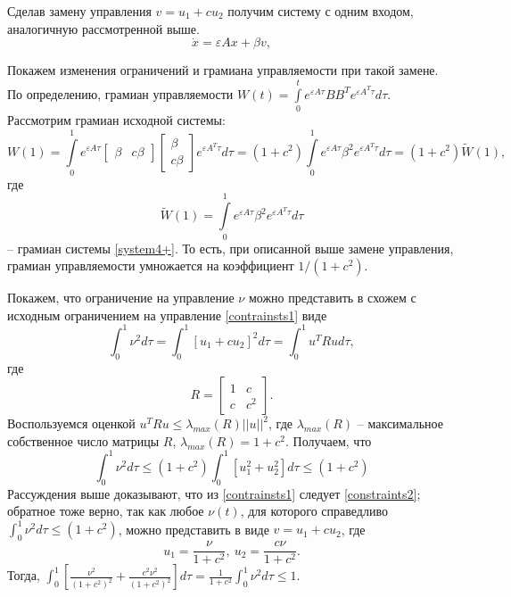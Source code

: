 \documentclass[../main.tex]{subfiles}
\begin{document}
Сделав   замену  управления $ v = u_1 + c u_2 $ получим систему с одним входом, аналогичную рассмотренной выше.
\begin{equation}\label{system4+}
	\dot{x} = \varepsilon A x + \beta v, 
\end{equation}

Покажем изменения ограничений и грамиана управляемости при такой замене.
По определению, грамиан управляемости $ W(t) = \int \limits_0 ^ t e^{\varepsilon A\tau} B B^T e^{\varepsilon A^T\tau} d\tau  $. Рассмотрим грамиан исходной системы: 
\begin{equation*}
	W(1) = \int \limits_0 ^ 1 e^{\varepsilon A\tau}  \left[ \begin{array}{cc}
		\beta & c \beta
	\end{array} \right] \left[ \begin{array}{c}
		\beta
		\\ c \beta 
	\end{array} \right] e^{\varepsilon A^T\tau} d\tau = (1 + c^2)  \int \limits_0 ^ 1 e^{\varepsilon A\tau} \beta^2 e^{\varepsilon A^T\tau} d\tau = (1 + c^2) \tilde{W}(1),
\end{equation*}
где 
\begin{equation*}
	\tilde{W}(1) = \int \limits_0 ^ 1 e^{\varepsilon A\tau} \beta^2 e^{\varepsilon A^T\tau} d\tau 
\end{equation*}
-- грамиан системы \eqref{system4+}. То есть, при описанной выше замене управления, грамиан управляемости умножается на коэффициент $ 1/(1 + c^2)$.


Покажем, что ограничение на управление $ \nu $  можно представить в схожем с исходным ограничением на управление \eqref{contrainsts1} виде
\begin{equation*}
	\int_{0}^{1} \nu ^2 d \tau  = \int_{0}^{1} \left[ u_1 + c u_2 \right]^2 d \tau =  \int_{0}^{1} u^T  R u d \tau,
\end{equation*}
где 
\begin{equation*}
	R = \left[ \begin{array}{cc}
		1 & c \\ 
		c & c^2
	\end{array} \right].
\end{equation*}
Воспользуемся оценкой $
u^T R u \leq \lambda_{max}(R) || u ||^2 $, где $ \lambda_{max}(R) $ -- максимальное собственное число матрицы $ R $, $ \lambda_{max}(R)  = 1 + c^2 $.
Получаем, что
\begin{equation}\label{constraints2}
	\int_{0}^{1} \nu ^2 d \tau \leq (1 + c^2) \int_{0}^{1} \left[ u_1^2 + u_2^2 \right] d \tau \leq (1 + c^2)
\end{equation}
Рассуждения выше доказывают, что из \eqref{contrainsts1} следует \eqref{constraints2}; обратное тоже верно, так как любое $ \nu(t) $, для которого справедливо $ \int_{0}^{1} \nu ^2 d \tau \leq (1 + c^2) $, можно представить в виде $ v = u_1 + c u_2 $, где 
\begin{equation*}
	u_1 = \frac{\nu}{1+c^2}, \ u_2 = \frac{c \nu}{1+c^2}.
\end{equation*}
Тогда, $ \int_0^1 \left[ \frac{\nu^2}{(1+c^2)^2} + \frac{c^2 \nu^2}{(1+c^2)^2}\right] d \tau = \frac{1}{1+c^2} \int_{0}^{1} \nu ^2 d \tau  \leq 1 $. 
\end{document}
